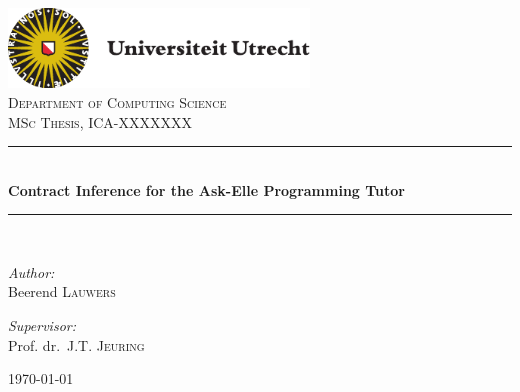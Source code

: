 \documentclass[10pt]{report}
\newcommand{\HRule}{\rule{\linewidth}{0.5mm}}
\begin{document}
\begin{titlepage}
\begin{center}

\includegraphics[width=0.6\textwidth]{./uulogo}\\[0.75cm]

\textsc{\Large Department of Computing Science}\\[1.5cm]

\textsc{\Large MSc Thesis, ICA-XXXXXXX}\\[0.5cm]

\HRule \\[0.4cm]
{ \huge \bfseries Contract Inference for the Ask-Elle Programming Tutor}\\[0.4cm]

\HRule \\[1.5cm]

\begin{minipage}{0.4\textwidth}
\begin{flushleft} \large
\emph{Author:}\\
Beerend \textsc{Lauwers}
\end{flushleft}
\end{minipage}
\begin{minipage}{0.4\textwidth}
\begin{flushright} \large
\emph{Supervisor:} \\
Prof. dr.~J.T. \textsc{Jeuring}
\end{flushright}
\end{minipage}

\vfill

{\large \today}

\end{center}
\end{titlepage}
\end{document}
